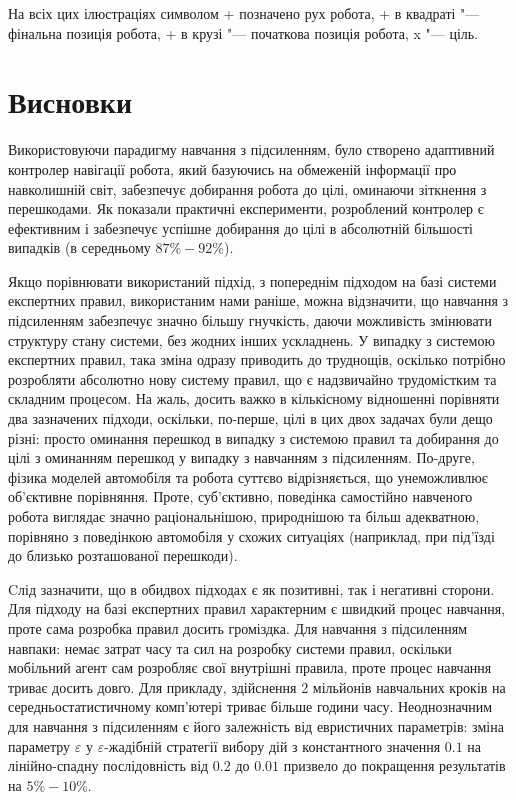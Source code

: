 \documentclass[a4paper,10pt,fleqn]{article}
\begin{document}
На всіх цих ілюстраціях символом + позначено рух робота, + в квадраті "--- фінальна позиція робота, + в крузі "--- початкова позиція робота, x "--- ціль.

\section{Висновки}

Використовуючи парадигму навчання з підсиленням, було створено адаптивний контролер навігації робота, який базуючись на обмеженій інформації про навколишній світ, забезпечує добирання робота до цілі, оминаючи зіткнення з перешкодами. Як показали практичні експерименти, розроблений контролер є ефективним і забезпечує успішне добирання до цілі в абсолютній більшості випадків (в середньому $87\%-92\%$).

Якщо порівнювати використаний підхід, з попереднім підходом на базі системи експертних правил, використаним нами раніше, можна відзначити, що навчання з підсиленням забезпечує значно більшу гнучкість, даючи можливість змінювати структуру стану системи, без жодних інших ускладнень. У випадку з системою експертних правил, така зміна одразу приводить до труднощів, оскілько потрібно розробляти абсолютно нову систему правил, що є надзвичайно трудомістким та складним процесом. На жаль, досить важко в кількісному відношенні порівняти два зазначених підходи, оскільки, по-перше, цілі в цих двох задачах були дещо різні: просто оминання перешкод в випадку з системою правил та добирання до цілі з оминанням перешкод у випадку з навчанням з підсиленням. По-друге, фізика моделей автомобіля та робота суттєво відрізняється, що унеможливлює об'єктивне порівняння. Проте, суб'єктивно, поведінка самостійно навченого робота виглядає значно раціональнішою, природнішою та більш адекватною, порівняно з поведінкою автомобіля у схожих ситуаціях (наприклад, при під'їзді до близько розташованої перешкоди).

Cлід зазначити, що в обидвох підходах є як позитивні, так і негативні сторони. Для підходу на базі експертних правил характерним є швидкий процес навчання, проте сама розробка правил досить громіздка. Для навчання з підсиленням навпаки: немає затрат часу та сил на розробку системи правил, оскільки мобільний агент сам розробляє свої внутрішні правила, проте процес навчання триває досить довго. Для прикладу, здійснення 2 мільйонів навчальних кроків на середньостатистичному комп'ютері триває більше години часу. Неоднозначним для навчання з підсиленням є його залежність від евристичних параметрів: зміна параметру $\varepsilon$ у $\varepsilon$-жадібній стратегії вибору дій з константного значення $0.1$ на лінійно-спадну послідовність від $0.2$ до $0.01$ призвело до покращення результатів на $5\%-10\%$.
\end{document}
